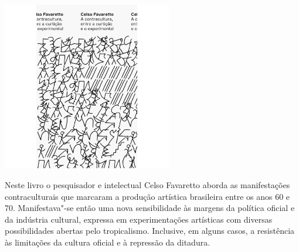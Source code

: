 \vfill

\hspace*{-.4cm}\begin{minipage}[c]{1\linewidth}
\small{
{}}
\end{minipage}

\pagebreak %


\begin{center}
\hspace*{-3.6cm}
\hspace*{3.1cm}\includegraphics[width=74mm]{./grid/favaretto.png}
\end{center}

\hspace*{-7cm}\hrulefill\hspace*{-7cm}

\medskip

\noindent{}Neste livro o pesquisador e intelectual Celso Favaretto aborda as manifestações contraculturais que marcaram a produção artística brasileira entre os anos 60 e 70. Manifestava"-se então uma nova sensibilidade às margens da política oficial e da indústria cultural, expressa em experimentações artísticas com diversas possibilidades abertas pelo tropicalismo.  Inclusive, em alguns casos, a resistência às limitações da cultura oficial e à repressão da ditadura.

